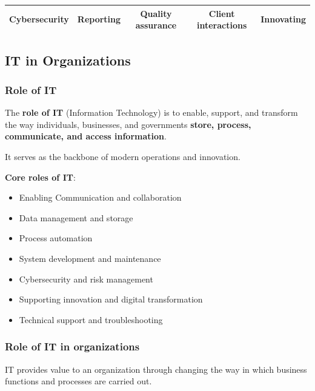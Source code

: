 \begin{table}[h]
\begin{tabular}{|c|c|c|c|cl|}
\textbf{Cybersecurity} & Reporting                                                                       & Quality assurance                                                              & Client interactions                                                               & \multicolumn{2}{c|}{Innovating}                                                                \\ \hline
\end{tabular}
\end{table}

\subsection{IT in Organizations}

\subsubsection{Role of IT}

\indent

The \textbf{role of IT} (Information Technology) is to enable, support, and transform the way individuals, businesses, and governments \textbf{store, process, communicate, and access information}.

It serves as the backbone of modern operations and innovation.

\bigskip

\noindent\textbf{Core roles of IT}:

\begin{itemize}
    \item Enabling Communication and collaboration
    \item Data management and storage
    \item Process automation
    \item System development and maintenance
    \item Cybersecurity and risk management
    \item Supporting innovation and digital transformation
    \item Technical support and troubleshooting
\end{itemize}

\subsubsection{Role of IT in organizations}

\indent

IT provides value to an organization through changing the way in which business functions and processes are carried out.

